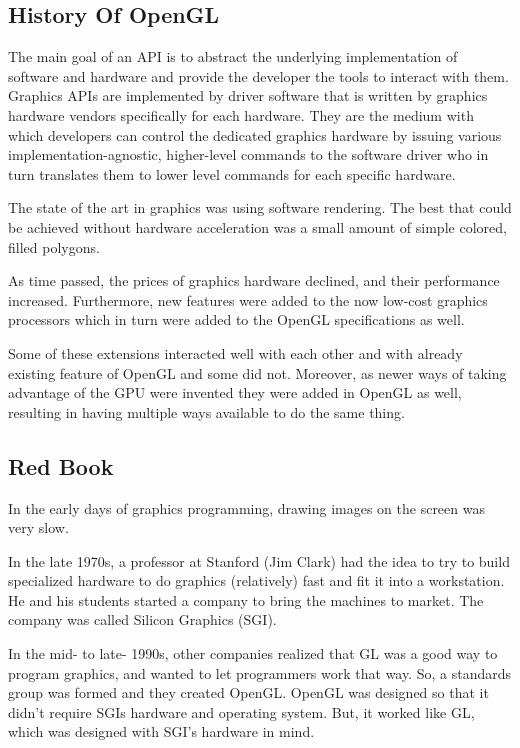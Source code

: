 \subsection{History Of OpenGL}

The main goal of an API is to
abstract the underlying implementation of software and hardware and provide
the developer the tools to interact with them.
Graphics APIs are implemented
by driver software that is written by graphics hardware vendors specifically
for each hardware. They are the medium with which developers can control
the dedicated graphics hardware by issuing various implementation-agnostic,
higher-level commands to the software driver who in turn translates them to
lower level commands for each specific hardware.

The state of the art in graphics was
using software rendering. The best that could be achieved without hardware
acceleration was a small amount of simple colored, filled polygons.

As time passed, the prices of graphics hardware declined, and their performance
increased. Furthermore, new features were added to the now low-cost
graphics processors which in turn were added to the OpenGL specifications as
well.

Some of these extensions interacted well with each other and
with already existing feature of OpenGL and
some did not. Moreover, as newer ways of taking advantage of the GPU were
invented they were added in OpenGL as well, resulting in having multiple ways
available to do the same thing.

\subsection{Red Book}

In the early days of graphics programming, drawing images on the screen was very
slow.

In the late 1970s, a professor at Stanford (Jim Clark) had the idea to try
to build specialized hardware to do graphics (relatively) fast and fit it into a
workstation.
He and his students started a company to bring the machines to market. The
company was called Silicon Graphics (SGI).

In the mid- to late- 1990s, other companies realized that GL was a good
way to program graphics, and wanted to let programmers work that way. So, a
standards group was formed and they created OpenGL. OpenGL was designed
so that it didn't require SGIs hardware and operating system. But, it worked like
GL, which was designed with SGI's hardware in mind.

